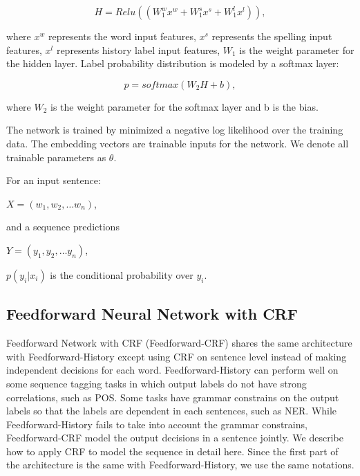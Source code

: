 \documentclass{sfuthesis}
\begin{document}
\begin{equation}
H=Relu\left(\left( W_{1}^{w}x^{w}+W_{1}^{s}x^{s}+W_{1}^{l}x^{l}\right)\right),
\end{equation}

where $x^{w}$ represents the word input features, $x^{s}$ represents the spelling input features, $x^{l}$ represents history label input features, $W_{1}$ is the weight parameter for the hidden layer. Label probability distribution is modeled by a softmax layer:

\begin{equation}
p=softmax\left(W_{2}H+b\right),
\end{equation}

where $W_{2}$ is the weight parameter for the softmax layer and b is the bias.

The network is trained by minimized a negative log likelihood over the training data. The embedding vectors are trainable inputs for the network. We denote all trainable parameters as $\theta$.

For an input sentence:

\begin{center}
$X=\left( w_{1},w_{2},\ldots w_{n}\right)$, 
\end{center}

and a sequence predictions

\begin{center}
$Y=\left( y_{1},y_{2},\ldots y_{n}\right)$,
\end{center}

$p\left( y_{i}|x_{i}\right)$ is the conditional probability over $y_{i}$.

\subsection{Feedforward Neural Network with CRF}
\label{Feedforward-CRF}
Feedforward Network with CRF (Feedforward-CRF) shares the same architecture with Feedforward-History except using CRF on sentence level instead of making independent decisions for each word. Feedforward-History can perform well on some sequence tagging tasks in which output labels do not have strong correlations, such as POS. Some tasks have grammar constrains on the output labels so that the labels are dependent in each sentences, such as NER. While Feedforward-History fails to take into account the grammar constrains, Feedforward-CRF model the output decisions in a sentence jointly. We describe how to apply CRF to model the sequence in detail here. Since the first part of the architecture is the same with Feedforward-History, we use the same notations.
\end{document}
